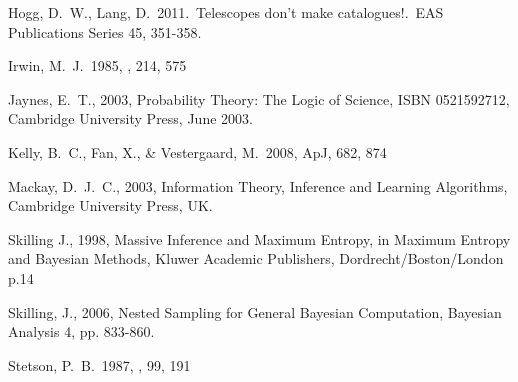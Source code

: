 \documentclass[manuscript]{aastex}
\begin{document}
\begin{thebibliography}{99}
 Hogg, D.~W., Lang, D.\ 
2011.\ Telescopes don't make catalogues!.\ EAS Publications Series 45, 
351-358. 

 Irwin, M.~J.\ 1985, \mnras, 214, 
575 

 Jaynes, E.~T., 2003, Probability Theory: The
Logic of Science, ISBN 0521592712, Cambridge University Press, June 2003.

 Kelly, B.~C., Fan, X., 
\& Vestergaard, M.\ 2008, ApJ, 682, 874 

 Mackay, D.~J.~C., 2003, Information Theory,
Inference and Learning Algorithms, Cambridge University Press, UK.

Skilling J., 1998, Massive Inference and Maximum Entropy, in Maximum Entropy 
and Bayesian Methods, Kluwer Academic Publishers, Dordrecht/Boston/London p.14

 Skilling, J., 2006, Nested Sampling for General Bayesian Computation, Bayesian Analysis 4, pp. 833-860.

 Stetson, P.~B.\ 1987, \pasp, 
99, 191 
\end{thebibliography}
\end{document}
